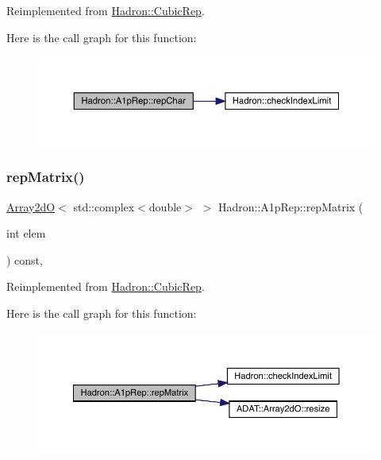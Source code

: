 Reimplemented from \mbox{\hyperlink{structHadron_1_1CubicRep_af45227106e8e715e84b0af69cd3b36f8}{Hadron\+::\+Cubic\+Rep}}.

Here is the call graph for this function\+:
\nopagebreak
\begin{figure}[H]
\begin{center}
\leavevmode
\includegraphics[width=350pt]{da/dc7/structHadron_1_1A1pRep_a9f59a2c62dd82462ab66f5a990939898_cgraph}
\end{center}
\end{figure}
\mbox{\label{structHadron_1_1A1pRep_a23b801cc71ff71d666e68a3c065d3fae}} 
\subsubsection{\texorpdfstring{repMatrix()}{repMatrix()}\hspace{0.1cm}{\footnotesize\ttfamily [1/2]}}
{\footnotesize\ttfamily \mbox{\hyperlink{classADAT_1_1Array2dO}{Array2dO}}$<$ std\+::complex$<$double$>$ $>$ Hadron\+::\+A1p\+Rep\+::rep\+Matrix (\begin{DoxyParamCaption}\item[{int}]{elem }\end{DoxyParamCaption}) const\hspace{0.3cm}{\ttfamily [inline]}, {\ttfamily [virtual]}}



Reimplemented from \mbox{\hyperlink{structHadron_1_1CubicRep_ac5d7e9e6f4ab1158b5fce3e4ad9e8005}{Hadron\+::\+Cubic\+Rep}}.

Here is the call graph for this function\+:
\nopagebreak
\begin{figure}[H]
\begin{center}
\leavevmode
\includegraphics[width=350pt]{da/dc7/structHadron_1_1A1pRep_a23b801cc71ff71d666e68a3c065d3fae_cgraph}
\end{center}
\end{figure}
\mbox{\label{structHadron_1_1A1pRep_a23b801cc71ff71d666e68a3c065d3fae}} 
